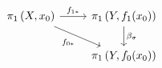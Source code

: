 \documentclass{article}
\begin{document}
    \begin{equation*}
        \begin{tikzcd}
            \pi_1\l(X,x_0\r) \ar[r, "f_{1\ast}"] \ar[dr, "f_{0\ast}"'] & \pi_1\l(Y,f_1\!\l(x_0\r)\r) \ar[d, "\beta_\sigma"] \\
                                                                       & \pi_1\l(Y,f_0\!\l(x_0\r)\r)
        \end{tikzcd}
    \end{equation*}
\end{document}
